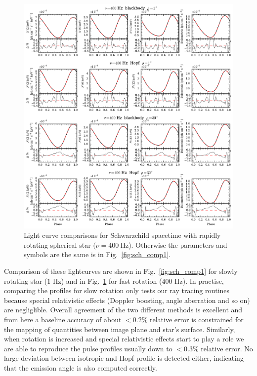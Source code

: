\documentclass[iop, usenatbib]{emulateapj}
\begin{document}
\begin{figure}
\centering
\includegraphics[width=18cm]{figs/fig2b.pdf}
\caption{\label{fig:sch_comp400}
  Light curve comparisons for Schwarzchild spacetime with rapidly rotating spherical star ($\nu = 400~\mathrm{Hz}$).
  Otherwise the parameters and symbols are the same is in Fig.~\ref{fig:sch_comp1}.
}
\end{figure}


Comparison of these lightcurves are shown in Fig.~\ref{fig:sch_comp1} for slowly rotating star ($1$ Hz) and in Fig.~\ref{fig:sch_comp400} for fast rotation ($400$ Hz).
In practise, comparing the profiles for slow rotation only tests our ray tracing routines because special relativistic effects (Doppler boosting, angle aberration and so on) are negliglible.
Overall agreement of the two different methods is excellent and from here a baseline accuracy of about $<0.2\%$ relative error is constrained for the mapping of quantities between image plane and star's surface.
Similarly, when rotation is increased and special relativistic effects start to play a role we are able to reproduce the pulse profiles usually down to $<0.3\%$ relative error.
No large deviation between isotropic and Hopf profile is detected either, indicating that the emission angle is also computed correctly.
\end{document}
